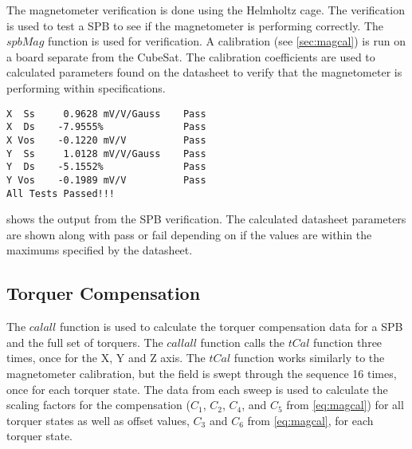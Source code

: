 The magnetometer verification is done using the Helmholtz cage. The verification is used to test a \ac{SPB} to see if the magnetometer is performing correctly. The \lstMat$spbMag$ function is used for verification. A calibration (see \cref{sec:magcal}) is run on a board separate from the CubeSat. The calibration coefficients are used to calculated parameters found on the datasheet to verify that the magnetometer is performing within specifications.

\begin{minipage}{\linewidth}
\begin{lstlisting}[caption={\ac{SPB} verification results},label={lst:vspb-res},language=verbatim]
X  Ss     0.9628 mV/V/Gauss    Pass
X  Ds    -7.9555%              Pass
X Vos    -0.1220 mV/V          Pass
Y  Ss     1.0128 mV/V/Gauss    Pass
Y  Ds    -5.1552%              Pass
Y Vos    -0.1989 mV/V          Pass
All Tests Passed!!!
\end{lstlisting}
\end{minipage}

 shows the output from the \ac{SPB} verification. The calculated datasheet parameters are shown along with pass or fail depending on if the values are within the maximums specified by the datasheet.


\subsection{Torquer Compensation}

\label{sec:tst-tq-comp}

The \lstMat$calall$ function is used to calculate the torquer compensation data for a \ac{SPB} and the full set of torquers. The \lstMat$callall$ function calls the \lstMat$tCal$ function three times, once for the X, Y and Z axis. The \lstMat$tCal$ function works similarly to the magnetometer calibration, but the field is swept through the sequence 16 times, once for each torquer state. The data from each sweep is used to calculate the scaling factors for the compensation ($C_1$, $C_2$, $C_4$, and $C_5$ from \cref{eq:magcal}) for all torquer states as well as offset values, $C_3$ and $C_6$ from \cref{eq:magcal}, for each torquer state.

